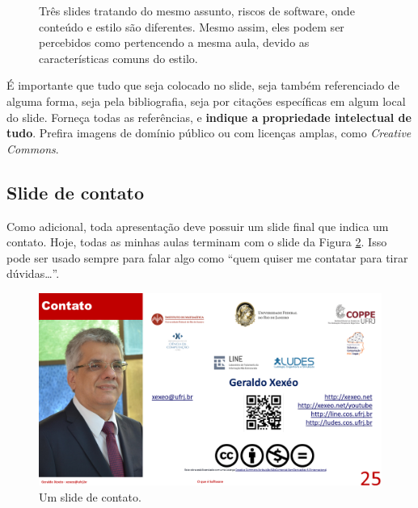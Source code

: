 \begin{figure}
    \centering
\caption{Três slides tratando do mesmo assunto, riscos de software, onde conteúdo e estilo são diferentes. Mesmo assim, eles podem ser percebidos como pertencendo a mesma aula, devido as características comuns do estilo.}
\label{fig:tres}
\end{figure}


É importante que tudo que seja colocado no slide, seja também referenciado de alguma forma, seja pela bibliografia, seja por citações específicas em algum local do slide.
Forneça todas as referências, e \textbf{indique a propriedade intelectual de tudo}. Prefira imagens de domínio público ou com licenças amplas, como \textit{Creative Commons}.


\subsection{Slide de contato}

Como adicional, toda apresentação deve possuir um slide final que indica um contato. Hoje, todas as minhas aulas terminam com o slide da Figura \ref{fig:fim}. Isso pode ser usado sempre para falar algo como ``quem quiser me contatar para tirar dúvidas\dots''.

\begin{figure}[h]
    \centering
    \includegraphics[width=\tam\linewidth,frame]{imagens/fim.png}
    \caption{Um slide de contato.}
    \label{fig:fim}
\end{figure}
